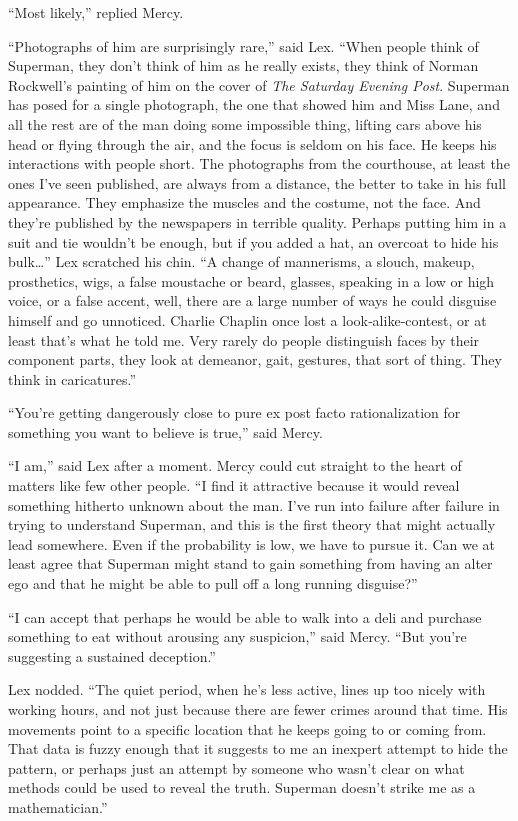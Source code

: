 \documentclass[ebook,12pt]{memoir}
\begin{document}
``Most likely,'' replied Mercy.

``Photographs of him are surprisingly rare,'' said Lex. ``When people
think of Superman, they don't think of him as he really exists, they
think of Norman Rockwell's painting of him on the cover of \emph{The
Saturday Evening Post}. Superman has posed for a single photograph, the
one that showed him and Miss Lane, and all the rest are of the man doing
some impossible thing, lifting cars above his head or flying through the
air, and the focus is seldom on his face. He keeps his interactions with
people short. The photographs from the courthouse, at least the ones
I've seen published, are always from a distance, the better to take in
his full appearance. They emphasize the muscles and the costume, not the
face. And they're published by the newspapers in terrible quality.
Perhaps putting him in a suit and tie wouldn't be enough, but if you
added a hat, an overcoat to hide his bulk\ldots'' Lex scratched his
chin. ``A change of mannerisms, a slouch, makeup, prosthetics, wigs, a
false moustache or beard, glasses, speaking in a low or high voice, or a
false accent, well, there are a large number of ways he could disguise
himself and go unnoticed. Charlie Chaplin once lost a
look‐alike‐contest, or at least that's what he told me. Very rarely do
people distinguish faces by their component parts, they look at
demeanor, gait, gestures, that sort of thing. They think in
caricatures.''

``You're getting dangerously close to pure ex post facto rationalization
for something you want to believe is true,'' said Mercy.

``I am,'' said Lex after a moment. Mercy could cut straight to the heart
of matters like few other people. ``I find it attractive because it
would reveal something hitherto unknown about the man. I've run into
failure after failure in trying to understand Superman, and this is the
first theory that might actually lead somewhere. Even if the probability
is low, we have to pursue it. Can we at least agree that Superman might
stand to gain something from having an alter ego and that he might be
able to pull off a long running disguise?''

``I can accept that perhaps he would be able to walk into a deli and
purchase something to eat without arousing any suspicion,'' said Mercy.
``But you're suggesting a sustained deception.''

Lex nodded. ``The quiet period, when he's less active, lines up too
nicely with working hours, and not just because there are fewer crimes
around that time. His movements point to a specific location that he
keeps going to or coming from. That data is fuzzy enough that it
suggests to me an inexpert attempt to hide the pattern, or perhaps just
an attempt by someone who wasn't clear on what methods could be used to
reveal the truth. Superman doesn't strike me as a mathematician.''
\end{document}
